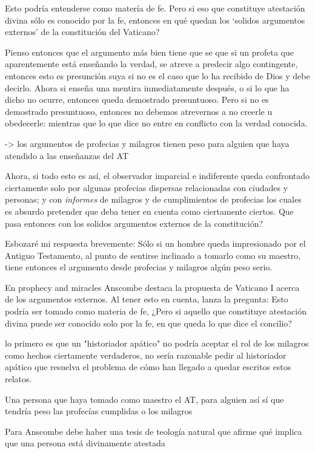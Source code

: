 Esto podría entenderse como matería de fe. Pero si eso que constituye atestación
divina sólo es conocido por la fe, entonces en qué quedan los `solidos
argumentos externos' de la constitución del Vaticano?

Pienso entonces que el argumento más bien tiene que se que si un profeta que
aparentemente está enseñando la verdad, se atreve a predecir algo contingente,
entonces esto es presunción suya si no es el caso que lo ha recibido de Dios y
debe decirlo. Ahora si enseña una mentira inmediatamente después, o si lo que ha
dicho no ocurre, entonces queda demostrado presuntuoso. Pero si no es demostrado
presuntuoso, entonces no debemos atrevernos a no creerle u obedecerle: mientras
que lo que dice no entre en conflicto con la verdad conocida.


-> los argumentos de profecias y milagros tienen peso para alguien que haya
atendido a las enseñanzas del AT

Ahora, si todo esto es así, el observador imparcial e indiferente queda
confrontado ciertamente solo por algunas profecias dispersas relacionadas con
ciudades y personas; y con \emph{informes} de milagros y de cumplimientos de
profecias los cuales es absurdo pretender que deba tener en cuenta como
ciertamente ciertos.
Que pasa entonces con los solidos argumentos externos de la constitución?

Esbozaré mi respuesta brevemente: Sólo si un hombre queda impresionado por el
Antiguo Testamento, al punto de sentirse inclinado a tomarlo como su maestro,
tiene entonces el argumento desde profecias y milagros algún peso serio.

En prophecy and miracles Anscombe destaca la propuesta de Vaticano I acerca de los
argumentos externos.
Al tener esto en cuenta, lanza la pregunta: Esto podría ser tomado como materia de fe,
¿Pero si aquello que constituye atestación divina puede ser conocido solo por la fe, en
que queda lo que dice el concilio?

lo primero es que un "historiador apático" no podría aceptar el rol de los milagros
como hechos ciertamente verdaderos, no sería razonable pedir al historiador apático que
resuelva el problema de cómo han llegado a quedar escritos estos relatos.

Una persona que haya tomado como maestro el AT, para alguien así sí que tendría peso
las profecías cumplidas o los milagros

Para Anscombe debe haber una tesis de teología natural que afirme qué implica que una
persona está divinamente atestada

